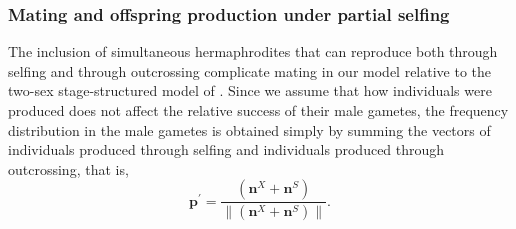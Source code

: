 \documentclass[11pt]{article}
\def\mbf#1{\mathbf{#1}}
\begin{document}
\subsubsection*{Mating and offspring production under partial selfing}
The inclusion of simultaneous hermaphrodites that can reproduce both through selfing and through outcrossing complicate mating in our model relative to the two-sex stage-structured model of \citet{deVriesCaswell2019b}. Since we assume that how individuals were produced does not affect the relative success of their male gametes, the frequency distribution in the male gametes is obtained simply by summing the vectors of individuals produced through selfing and individuals produced through outcrossing, that is, 
\begin{equation}
 	\mbf{p}^{\prime}=\frac{(\mbf{n}^X + \mbf{n}^S)}{\| (\mbf{n}^X + \mbf{n}^S)\|}.
 \end{equation} 
\end{document}
